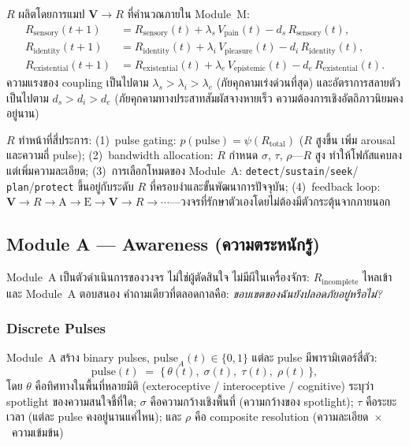 \documentclass[12pt,a4paper]{article}
\newcommand{\Rtot}{R_{\mathrm{total}}}
\newcommand{\Rsens}{R_{\mathrm{sensory}}}
\newcommand{\Rid}{R_{\mathrm{identity}}}
\newcommand{\Rex}{R_{\mathrm{existential}}}
\newcommand{\vpain}{V_{\mathrm{pain}}}
\newcommand{\vpleasure}{V_{\mathrm{pleasure}}}
\newcommand{\vepi}{V_{\mathrm{epistemic}}}
\begin{document}
$R$ ผลิตโดยการแมป $\mathbf{V}\!\to\!R$ ที่คำนวณภายใน Module~M:
\begin{align}
  \Rsens(t{+}1)  &= \Rsens(t)  + \lambda_s\,\vpain(t)    - d_s\,\Rsens(t),
                  \label{eq:Rsens}\\
  \Rid(t{+}1)    &= \Rid(t)    + \lambda_i\,\vpleasure(t) - d_i\,\Rid(t),
                  \label{eq:Rid}\\
  \Rex(t{+}1)    &= \Rex(t)    + \lambda_e\,\vepi(t)      - d_e\,\Rex(t).
                  \label{eq:Rex}
\end{align}
ความแรงของ coupling เป็นไปตาม $\lambda_s > \lambda_i > \lambda_e$
(ภัยคุกคามเร่งด่วนที่สุด) และอัตราการสลายตัวเป็นไปตาม
$d_s > d_i > d_e$ (ภัยคุกคามทางประสาทสัมผัสจางหายเร็ว
ความต้องการเชิงอัตถิภาวนิยมคงอยู่นาน)

$R$ ทำหน้าที่สี่ประการ: (1)~pulse gating: $p(\mathrm{pulse}) = \psi(\Rtot)$
($R$ สูงขึ้น เพิ่ม arousal และความถี่ pulse);
(2)~bandwidth allocation: $R$ กำหนด $\sigma$, $\tau$, $\rho$---$R$ สูง
ทำให้โฟกัสแคบลงแต่เพิ่มความละเอียด;
(3)~การเลือกโหมดของ Module~A: \texttt{detect}/\texttt{sustain}/\texttt{seek}/
\texttt{plan}/\texttt{protect} ขึ้นอยู่กับระดับ $R$ ที่ครอบงำและขั้นพัฒนาการปัจจุบัน;
(4)~feedback loop: $\mathbf{V}\to R\to\mathrm{A}\to\mathrm{E}\to\mathbf{V}\to
R\to\cdots$---วงจรที่รักษาตัวเองโดยไม่ต้องมีตัวกระตุ้นจากภายนอก

\subsection{Module A --- Awareness (ความตระหนักรู้)}

Module~A เป็นตัวดำเนินการของวงจร ไม่ใช่ผู้ตัดสินใจ ไม่มีผีในเครื่องจักร:
$R_{\mathrm{incomplete}}$ ไหลเข้าและ Module~A ตอบสนอง
คำถามเดียวที่ตลอดกาลคือ: \emph{ขอบเขตของฉันยังปลอดภัยอยู่หรือไม่?}

\subsubsection{Discrete Pulses}

Module~A สร้าง binary pulses, $\mathrm{pulse}_A(t)\in\{0,1\}$
แต่ละ pulse มีพารามิเตอร์สี่ตัว:
\begin{equation}
  \mathrm{pulse}(t) \;=\; \bigl\{\,\theta(t),\;\sigma(t),\;\tau(t),\;\rho(t)\,\bigr\},
\end{equation}
โดย $\theta$ คือทิศทางในพื้นที่หลายมิติ
(exteroceptive / interoceptive / cognitive) ระบุว่า spotlight ของความสนใจชี้ที่ใด;
$\sigma$ คือความกว้างเชิงพื้นที่ (ความกว้างของ spotlight);
$\tau$ คือระยะเวลา (แต่ละ pulse คงอยู่นานแค่ไหน); และ
$\rho$ คือ composite resolution (ความละเอียด~$\times$~ความเข้มข้น)
\end{document}
